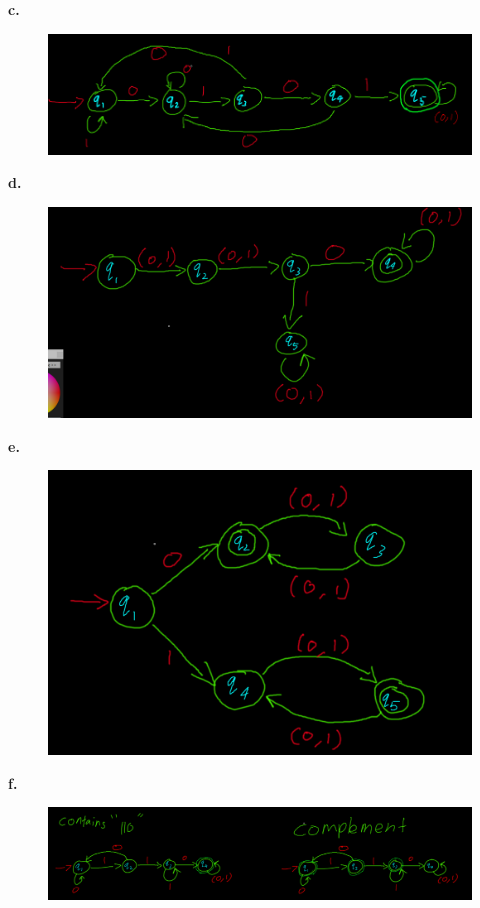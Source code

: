 \documentclass[letter]{article}
\theoremstyle{case}
\begin{document}
\textbf{c.}
\begin{figure}[h!]
	\includegraphics[scale=0.4]{6c.png}
\end{figure}
\newpage
\textbf{d.}
\begin{figure}[h!]
	\includegraphics[scale=0.4]{6d.png}
\end{figure}

\textbf{e.}
\begin{figure}[h!]
	\includegraphics[scale=0.4]{6e.png}
\end{figure}
 \newpage
\textbf{f.}
\begin{figure}[h!]
	\includegraphics[scale=0.4]{6f.png}
\end{figure}
\end{document}
